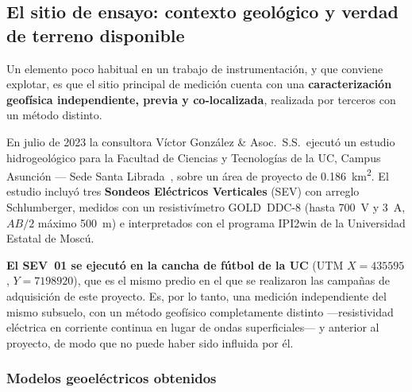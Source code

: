 \subsection{El sitio de ensayo: contexto geol\'ogico y verdad de terreno disponible}
\label{sec:sitio-sev}

Un elemento poco habitual en un trabajo de instrumentaci\'on, y que conviene explotar, es
que el sitio principal de medici\'on cuenta con una \textbf{caracterizaci\'on geof\'isica
independiente, previa y co-localizada}, realizada por terceros con un m\'etodo distinto.

En julio de 2023 la consultora V\'ictor Gonz\'alez \& Asoc.~S.S.\ ejecut\'o un estudio
hidrogeol\'ogico para la Facultad de Ciencias y Tecnolog\'ias de la UC, Campus Asunci\'on
--- Sede Santa Librada~\cite{GonzalezHidro2023}, sobre un \'area de proyecto de
\SI{0.186}{\kilo\meter\squared}. El estudio incluy\'o tres \textbf{Sondeos El\'ectricos
Verticales} (SEV) con arreglo Schlumberger, medidos con un resistiv\'imetro GOLD~DDC-8
(hasta \SI{700}{\volt} y \SI{3}{\ampere}, $AB/2$ m\'aximo \SI{500}{\meter}) e
interpretados con el programa IPI2win de la Universidad Estatal de Mosc\'u.

\textbf{El SEV~01 se ejecut\'o en la cancha de f\'utbol de la UC} (UTM
$X=\num{435595}$, $Y=\num{7198920}$), que es el mismo predio en el que se realizaron las
campa\~nas de adquisici\'on de este proyecto. Es, por lo tanto, una medici\'on
independiente del mismo subsuelo, con un m\'etodo geof\'isico completamente distinto
---resistividad el\'ectrica en corriente continua en lugar de ondas superficiales--- y
anterior al proyecto, de modo que no puede haber sido influida por \'el.

\subsubsection{Modelos geoel\'ectricos obtenidos}

